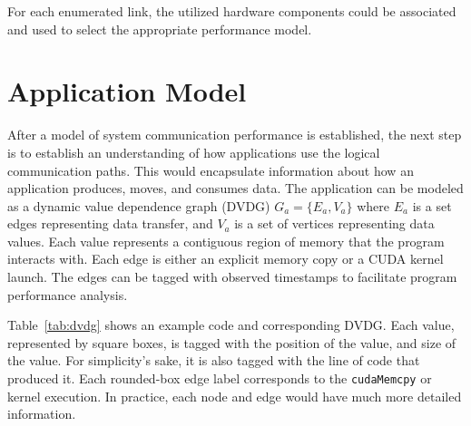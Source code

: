 For each enumerated link, the utilized hardware components could be associated and used to select the appropriate performance model.

\section{Application Model}
\label{sec:app-model}

After a model of system communication performance is established, the next step is to establish an understanding of how applications use the logical communication paths.
This would encapsulate information about how an application produces, moves, and consumes data.
The application can be modeled as a dynamic value dependence graph (DVDG) $G_a = \{E_a,V_a\}$ where $E_a$ is a set edges representing data transfer, and $V_a$ is a set of vertices representing data values.
Each value represents a contiguous region of memory that the program interacts with.
Each edge is either an explicit memory copy or a CUDA kernel launch.
The edges can be tagged with observed timestamps to facilitate program performance analysis.

Table~\ref{tab:dvdg} shows an example code and corresponding DVDG.
Each value, represented by square boxes, is tagged with the position of the value, and size of the value.
For simplicity's sake, it is also tagged with the line of code that produced it.
Each rounded-box edge label corresponds to the \texttt{cudaMemcpy} or kernel execution.
In practice, each node and edge would have much more detailed information.


